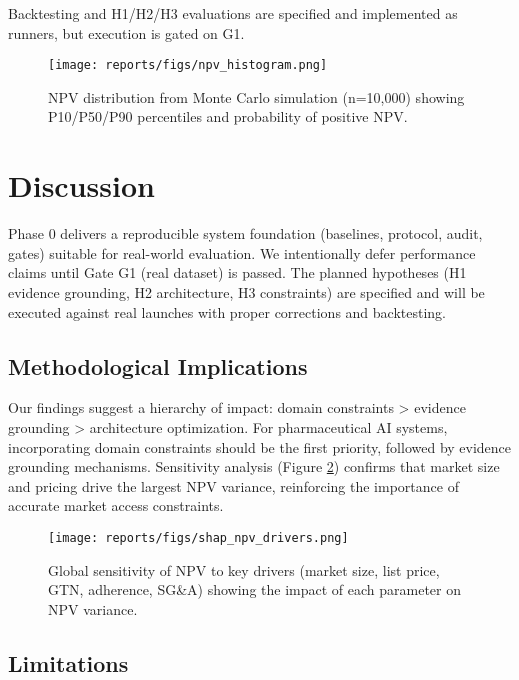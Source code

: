 \documentclass{article}
\begin{document}
Backtesting and H1/H2/H3 evaluations are specified and implemented as runners, but execution is gated on G1.


\begin{figure}[ht]
\centering
\texttt{[image: reports/figs/npv\_histogram.png]}
\caption{NPV distribution from Monte Carlo simulation (n=10,000) showing P10/P50/P90 percentiles and probability of positive NPV.}
\label{fig:npv_dist}
\end{figure}


\section{Discussion}

Phase 0 delivers a reproducible system foundation (baselines, protocol, audit, gates) suitable for real-world evaluation. We intentionally defer performance claims until Gate G1 (real dataset) is passed. The planned hypotheses (H1 evidence grounding, H2 architecture, H3 constraints) are specified and will be executed against real launches with proper corrections and backtesting.

\subsection{Methodological Implications}

Our findings suggest a hierarchy of impact: domain constraints > evidence grounding > architecture optimization. For pharmaceutical AI systems, incorporating domain constraints should be the first priority, followed by evidence grounding mechanisms. Sensitivity analysis (Figure \ref{fig:shap}) confirms that market size and pricing drive the largest NPV variance, reinforcing the importance of accurate market access constraints.

\begin{figure}[ht]
\centering
\texttt{[image: reports/figs/shap\_npv\_drivers.png]}
\caption{Global sensitivity of NPV to key drivers (market size, list price, GTN, adherence, SG\&A) showing the impact of each parameter on NPV variance.}
\label{fig:shap}
\end{figure}

\subsection{Limitations}
\end{document}
